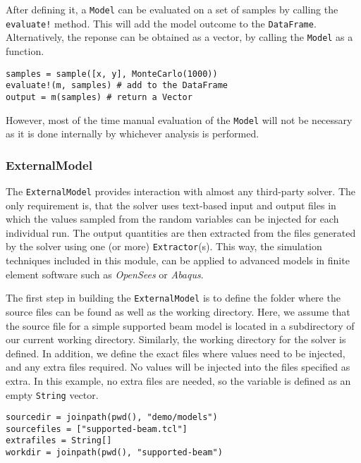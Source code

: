 After defining it, a \texttt{Model} can be evaluated on a set of samples by calling the \texttt{evaluate!} method. This will add the model outcome to the \texttt{DataFrame}. Alternatively, the reponse can be obtained as a vector, by calling the \texttt{Model} as a function.




\begin{verbatim}
samples = sample([x, y], MonteCarlo(1000))
evaluate!(m, samples) # add to the DataFrame
output = m(samples) # return a Vector
\end{verbatim}



However, most of the time manual evaluation of the \texttt{Model} will not be necessary as it is done internally by whichever analysis is performed.



\subsubsection{ExternalModel}



\label{11984978887985385641}{}


The \texttt{ExternalModel} provides interaction with almost any third-party solver. The only requirement is, that the solver uses text-based input and output files in which the values sampled from the random variables can be injected for each individual run. The output quantities are then extracted from the files generated by the solver using one (or more) \texttt{Extractor}(s). This way, the simulation techniques included in this module, can be applied to advanced models in finite element software such as \emph{OpenSees} or \emph{Abaqus}.



The first step in building the \texttt{ExternalModel} is to define the folder where the source files can be found as well as the working directory. Here, we assume that the source file for a simple supported beam model is located in a subdirectory of our current working directory. Similarly, the working directory for the solver is defined. In addition, we define the exact files where values need to be injected, and any extra files required. No values will be injected into the files specified as extra. In this example, no extra files are needed, so the variable is defined as an empty \texttt{String} vector.




\begin{verbatim}
sourcedir = joinpath(pwd(), "demo/models")
sourcefiles = ["supported-beam.tcl"]
extrafiles = String[]
workdir = joinpath(pwd(), "supported-beam")
\end{verbatim}






